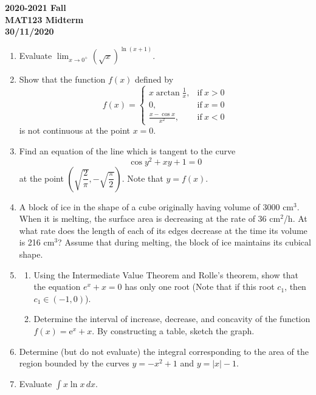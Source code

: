 \documentclass[a4paper, 12pt]{article}
\begin{document}
\newpage
{}
{}


\begin{center}
\textbf{2020-2021 Fall\\MAT123 Midterm\\30/11/2020}
\end{center}

\begin{enumerate}[leftmargin=*,label=\textbf{\arabic*.}]
\item Evaluate $\displaystyle\lim_{x\to0^+}(\sqrt x)^{\ln(x+1)}$.

\item Show that the function $f(x)$ defined by
\[
f(x)=
\begin{cases}
\displaystyle x\arctan\frac{1}{x},&\text{if}\ x>0\\[1em]
0,&\text{if}\ x=0\\[1em]
\displaystyle \frac{x-\cos x}{x^2},&\text{if}\ x<0
\end{cases}
\]
is not continuous at the point $x=0$.

\item Find an equation of the line which is tangent to the curve
\[\cos y^2+xy+1=0\]
at the point $\left(\sqrt{\dfrac{2}{\pi}},-\sqrt{\dfrac{\pi}{2}} \right)$. Note that $y=f(x)$.

\item A block of ice in the shape of a cube originally having volume of $3000$ cm$^3$. When it is melting, the surface area is decreasing at the rate of 36 cm$^2$/h. At what rate does the length of each of its edges decrease at the time its volume is 216 cm$^3$? Assume that during melting, the block of ice maintains its cubical shape.

\item \begin{enumerate}[leftmargin=*,label=\textbf{\alph*.}]
\item Using the Intermediate Value Theorem and Rolle’s theorem, show that the equation $e^x + x = 0$ has only one root (Note that if this root $c_1$, then $c_1\in(-1,0)$).
\item Determine the interval of increase, decrease, and concavity of the function $f(x)=\mathrm e^x+x$. By constructing a table, sketch the graph.
\end{enumerate}

\item Determine (but do not evaluate) the integral corresponding to the area of the region bounded by the curves $y=-x^2+1$ and $y =|x|-1$.

\item Evaluate $\displaystyle\int x\ln x\,dx$.
\end{enumerate}
\end{document}
